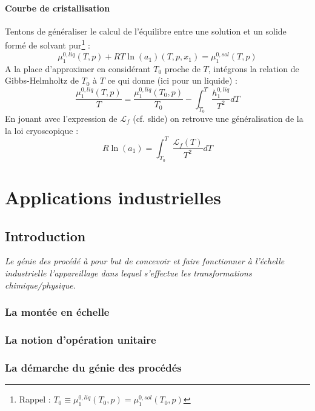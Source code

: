 \documentclass[11pt, a4paper, openany]{book}
\begin{document}
\subsection{Courbe de cristallisation}
Tentons de généraliser le calcul de l'équilibre entre une solution et un solide formé de solvant pur\footnote{Rappel : $T_0 \equiv \mu_1^{0,liq}(T_0,p) = \mu_1^{0,sol}(T_0,p)$} :
\begin{equation}
\mu_1^{0,liq}(T,p) + RT\ln(a_1)(T,p,x_1) = \mu_1^{0,sol}(T,p)
\end{equation}
A la place d'approximer en considérant $T_0$ proche de $T$, intégrons la relation de Gibbs-Helmholtz de $T_0$ à $T$ ce qui donne (ici pour un liquide) :
\begin{equation}
\frac{\mu_1^{0,liq}(T,p)}{T} = \frac{\mu_1^{0,liq}(T_0,p)}{T_0} - \int_{T_0}^T \frac{h_1^{0,liq}}{T^2}dT
\end{equation}
En jouant avec l'expression de $\mathcal{L}_f$ (cf. slide) on retrouve une généralisation de la la loi cryoscopique :
\begin{equation}
R\ln(a_1) = \int_{T_0}^T \frac{\mathcal{L}_f(T)}{T^2}dT
\end{equation}



\part{Applications industrielles}
\setcounter{chapter}{0}
\chapter{Introduction}
\textit{Le génie des procédé à pour but de concevoir et faire fonctionner à l'échelle 
industrielle l'appareillage dans lequel s'effectue les transformations chimique/physique.}

\section{La montée en échelle}


\section{La notion d'opération unitaire}



\section{La démarche du génie des procédés}
\end{document}
